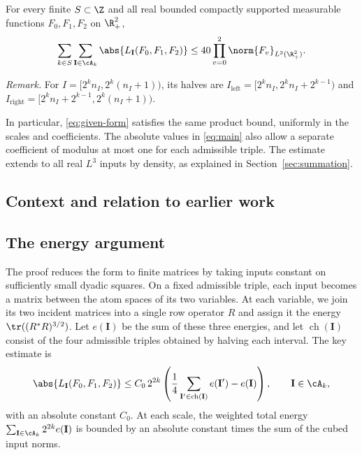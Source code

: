 \begin{theorem}\label{thm:main}
For every finite \(S\subset\Z\) and all real bounded compactly
supported measurable functions \(F_0,F_1,F_2\) on \(\R_+^2\),
\begin{equation}\label{eq:main}
 \sum_{k\in S}\sum_{\mathbf I\in\cA_k}
       \abs{L_{\mathbf I}(F_0,F_1,F_2)}
 \le 40\prod_{v=0}^2\norm{F_v}_{L^3(\R_+^2)}.
\end{equation}
\end{theorem}

\noindent\textit{Remark.} For $I=[2^kn_I,2^k(n_I+1))$, its halves are $I_{\mathrm{left}}=[2^kn_I,2^kn_I+2^{k-1})$ and $I_{\mathrm{right}}=[2^kn_I+2^{k-1},2^k(n_I+1))$.


In particular, \eqref{eq:given-form} satisfies the same product bound,
uniformly in the scales and coefficients. The absolute values in
\eqref{eq:main} also allow a separate coefficient of modulus at most one
for each admissible triple. The estimate extends to all real \(L^3\)
inputs by density, as explained in Section~\ref{sec:summation}.

\subsection{Context and relation to earlier work}


\subsection{The energy argument}

The proof reduces the form to finite matrices by taking inputs constant
on sufficiently small dyadic squares. On a fixed admissible triple,
each input becomes a matrix between the atom spaces of its two
variables. At each variable, we join its two incident matrices into a
single row operator \(R\) and assign it the energy
\(\tr((R^*R)^{3/2})\). Let \(e(\mathbf I)\) be the sum of these three
energies, and let \(\operatorname{ch}(\mathbf I)\) consist of the four
admissible triples obtained by halving each interval. The key estimate
is
\begin{equation}\label{eq:overview-gap}
 \abs{L_{\mathbf I}(F_0,F_1,F_2)}
 \le C_0\,2^{2k}
 \left(\frac14\sum_{\mathbf I'\in\operatorname{ch}(\mathbf I)}
                 e(\mathbf I')-e(\mathbf I)\right),
 \qquad \mathbf I\in\cA_k,
\end{equation}
with an absolute constant \(C_0\). At each scale, the weighted total
energy \(\sum_{\mathbf I\in\cA_k}2^{2k}e(\mathbf I)\) is bounded by an
absolute constant times the sum of the cubed input norms.

